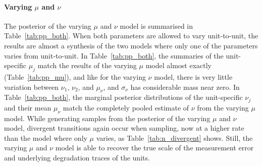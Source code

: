 \paragraph{Varying $\mu$ and $\nu$} The posterior of the varying $\mu$ and $\nu$ model is summarised in Table~\ref{tab:pp_both}. When both parameters are allowed to vary unit-to-unit, the results are almost a synthesis of the two models where only one of the parameters varies from unit-to-unit. In Table~\ref{tab:pp_both}, the summaries of the unit-specific $\mu_j$ match the results of the varying $\mu$ model almost exactly (Table~\ref{tab:pp_mu}), and like for the varying $\nu$ model, there is very little variation between $\nu_1$, $\nu_2$, and $\mu_\nu$, and $\sigma_\nu$ has considerable mass near zero. In Table~\ref{tab:pp_both}, the marginal posterior distributions of the unit-specific $\nu_j$ and their mean $\mu_\nu$ match the completely pooled estimate of $\nu$ from the varying $\mu$ model. While generating samples from the posterior of the varying $\mu$ and $\nu$ model, divergent transitions again occur when sampling, now at a higher rate than the model where only $\mu$ varies, as Table~\ref{tab:n_divergent} shows. Still, the varying $\mu$ and $\nu$ model is able to recover the true scale of the measurement error and underlying degradation traces of the units.



